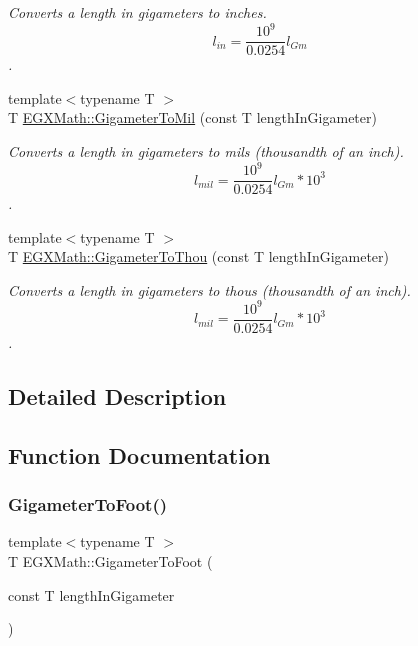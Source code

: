 \begin{DoxyCompactItemize}
\begin{DoxyCompactList}\small\item\em Converts a length in gigameters to inches. \[ l_{in}= \frac{10^{9}}{0.0254} l_{Gm} \]. \end{DoxyCompactList}\item 
{\footnotesize template$<$typename T $>$ }\\T \mbox{\hyperlink{group___e_g_x_math-_conversions-_length_conversions-_gigameter-_imperial_ga498a43d44c0c0f6527362688d6cc361f}{E\+G\+X\+Math\+::\+Gigameter\+To\+Mil}} (const T length\+In\+Gigameter)
\begin{DoxyCompactList}\small\item\em Converts a length in gigameters to mils (thousandth of an inch). \[ l_{mil}= \frac{10^{9}}{0.0254} l_{Gm} * 10^{3} \]. \end{DoxyCompactList}\item 
{\footnotesize template$<$typename T $>$ }\\T \mbox{\hyperlink{group___e_g_x_math-_conversions-_length_conversions-_gigameter-_imperial_ga94fd906264f882396dc438a684e22b41}{E\+G\+X\+Math\+::\+Gigameter\+To\+Thou}} (const T length\+In\+Gigameter)
\begin{DoxyCompactList}\small\item\em Converts a length in gigameters to thous (thousandth of an inch). \[ l_{mil}= \frac{10^{9}}{0.0254} l_{Gm} * 10^{3} \]. \end{DoxyCompactList}\end{DoxyCompactItemize}


\subsection{Detailed Description}


\subsection{Function Documentation}
\mbox{\label{group___e_g_x_math-_conversions-_length_conversions-_gigameter-_imperial_gaeabf3c29bcb3076a8b41986debbf046b}} 
\subsubsection{\texorpdfstring{Gigameter\+To\+Foot()}{GigameterToFoot()}}
{\footnotesize\ttfamily template$<$typename T $>$ \\
T E\+G\+X\+Math\+::\+Gigameter\+To\+Foot (\begin{DoxyParamCaption}\item[{const T}]{length\+In\+Gigameter }\end{DoxyParamCaption})}



